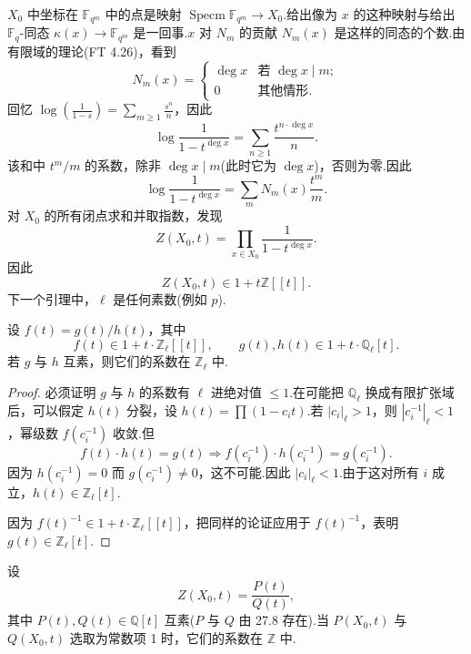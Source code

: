 $X_0$ 中坐标在 $\mathbb{F}_{q^m}$ 中的点是映射 $\operatorname{Specm} \mathbb{F}_{q^m} \to X_0$.给出像为 $x$ 的这种映射与给出 $\mathbb{F}_q$-同态 $\kappa(x) \to \mathbb{F}_{q^m}$ 是一回事.$x$ 对 $N_m$ 的贡献 $N_m(x)$ 是这样的同态的个数.由有限域的理论(FT 4.26)，看到
\[
N_m(x) = \begin{cases}
\deg x & \text{若 } \deg x \mid m;\\
0 & \text{其他情形}.
\end{cases}
\]
回忆 $\log\left( \frac{1}{1-s} \right) = \sum_{m \geq 1} \frac{s^{n}}{n}$，因此
\[
\log \frac{1}{1 - t^{\deg x}} = \sum_{n \geq 1} \frac{t^{n \cdot \deg x}}{n}.
\]
该和中 $t^{m}/m$ 的系数，除非 $\deg x \mid m$(此时它为 $\deg x$)，否则为零.因此
\[
\log \frac{1}{1 - t^{\deg x}} = \sum_{m} N_m(x) \frac{t^{m}}{m}.
\]
对 $X_0$ 的所有闭点求和并取指数，发现
\begin{equation}
Z(X_0, t) = \prod_{x \in X_0} \frac{1}{1 - t^{\deg x}}. \tag{4}
\end{equation}
因此
\[
Z(X_0, t) \in 1 + t\mathbb{Z}[[t]].
\]
下一个引理中，$\ell$ 是任何素数(例如 $p$).

\begin{lemma}\label{lem:27.10}
设 $f(t) = g(t)/h(t)$，其中
\[
f(t) \in 1 + t \cdot \mathbb{Z}_{\ell}[[t]], \qquad g(t), h(t) \in 1 + t \cdot \mathbb{Q}_{\ell}[t].
\]
若 $g$ 与 $h$ 互素，则它们的系数在 $\mathbb{Z}_{\ell}$ 中.
\end{lemma}

\begin{proof}
必须证明 $g$ 与 $h$ 的系数有 $\ell$ 进绝对值 $\leq 1$.在可能把 $\mathbb{Q}_{\ell}$ 换成有限扩张域后，可以假定 $h(t)$ 分裂，设 $h(t) = \prod (1 - c_i t)$.若 $|c_i|_{\ell} > 1$，则 $|c^{-1}_i|_{\ell} < 1$，幂级数 $f(c^{-1}_i)$ 收敛.但
\[
f(t) \cdot h(t) = g(t) \Rightarrow f(c^{-1}_i) \cdot h(c^{-1}_i) = g(c^{-1}_i).
\]
因为 $h(c^{-1}_i) = 0$ 而 $g(c^{-1}_i) \neq 0$，这不可能.因此 $|c_i|_{\ell} < 1$.由于这对所有 $i$ 成立，$h(t) \in \mathbb{Z}_{\ell}[t]$.

因为 $f(t)^{-1} \in 1 + t \cdot \mathbb{Z}_{\ell}[[t]]$，把同样的论证应用于 $f(t)^{-1}$，表明 $g(t) \in \mathbb{Z}_{\ell}[t]$.
\end{proof}

\begin{proposition}\label{prop:27.11}
设
\[
Z(X_0, t) = \frac{P(t)}{Q(t)},
\]
其中 $P(t), Q(t) \in \mathbb{Q}[t]$ 互素($P$ 与 $Q$ 由 27.8 存在).当 $P(X_0, t)$ 与 $Q(X_0, t)$ 选取为常数项 1 时，它们的系数在 $\mathbb{Z}$ 中.
\end{proposition}

